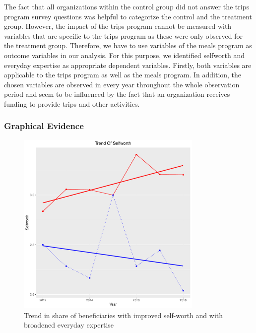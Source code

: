 \documentclass[12pt, a4paper, titlepage]{article}\usepackage[]{graphicx}\usepackage[]{color}
\newenvironment{knitrout}{}{} %
\begin{document}
The fact that all organizations within the control group did not answer the trips program survey questions was helpful to categorize the control and the treatment group. However, the impact of the trips program cannot be measured with variables that are specific to the trips program as these were only observed for the treatment group. Therefore, we have to use variables of the meals program as outcome variables in our analysis. For this purpose, we identified selfworth and everyday expertise as appropriate dependent variables. Firstly, both variables are applicable to the trips program as well as the meals program. In addition, the chosen variables are observed in every year throughout the whole observation period and seem to be influenced by the fact that an organization receives funding to provide trips and other activities.

\subsubsection{Graphical Evidence}

\begin{figure}
  \caption{Trend in share of beneficiaries with improved self-worth and with broadened everyday expertise}
  \label{selfworth_Trend}

\begin{knitrout}
\color{fgcolor}

{\centering \includegraphics[width=0.8\textwidth]{figure/Selfworth-1} 

}



\end{knitrout}

\end{figure}
\end{document}

